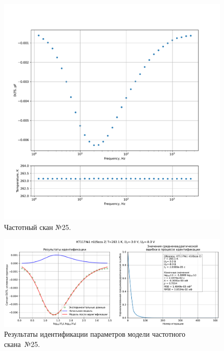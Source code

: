 \begin{figure}[!ht]
    \centering
    \includegraphics[width=1\textwidth]{../plots/КТ117№1_п1(база 2)_2500Гц-1Гц_1пФ_-10С_-3В-8В_100мВ_20мкс_шаг_0,1.pdf}
    \caption{Частотный скан №25.}
    \label{pic:frequency_scan_25}
\end{figure}

\begin{figure}[!ht]
    \centering
    \includegraphics[width=1\textwidth]{../plots/КТ117№1_п1(база 2)_2500Гц-1Гц_1пФ_-10С_-3В-8В_100мВ_20мкс_шаг_0,1_model.pdf}
    \caption{Результаты идентификации параметров модели частотного скана~№25.}
    \label{pic:frequency_scan_model25}
\end{figure}

\pagebreak


